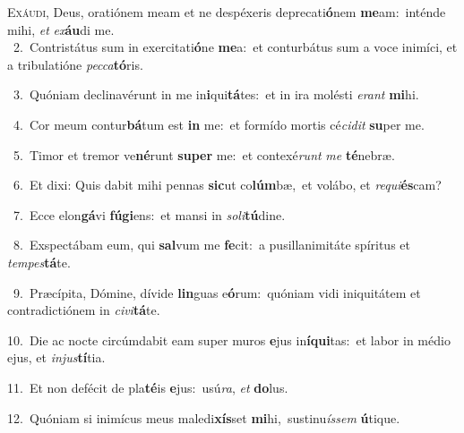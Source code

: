 \lettrine{\initial\textcolor{\initialcolor}{E}}{xáudi,} Deus, oratiónem meam et ne despéxeris deprecati\-\textbf{ó}\-nem \textbf{me}\-am:~\star inténde mihi, \textit{et} \textit{ex}\-\textbf{áu}di me.\\
{\numbfont\textcolor{\numbcolor}{~2.}}~Contristátus sum in exercitati\-\textbf{ó}\-ne \textbf{me}\-a:~\star et conturbátus sum a voce inimíci, et a tribulatióne \textit{pec}\-\textit{ca}\textbf{tó}ris.\par
{\numbfont\textcolor{\numbcolor}{~3.}}~Quóniam declinavérunt in me in\-\textbf{i}\-qui\-\textbf{tá}\-tes:~\star et in ira molésti \textit{e}\-\textit{rant} \textbf{mi}\-hi.\par
{\numbfont\textcolor{\numbcolor}{~4.}}~Cor meum contur\-\textbf{bá}\-tum est \textbf{in} me:~\star et formído mortis cé\-\textit{ci}\-\textit{dit} \textbf{su}\-per me.\par
{\numbfont\textcolor{\numbcolor}{~5.}}~Timor et tremor ve\-\textbf{né}\-runt \textbf{su}\-\textbf{per} me:~\star et contexé\textit{runt} \textit{me} \textbf{té}\-nebræ.\par
{\numbfont\textcolor{\numbcolor}{~6.}}~Et dixi: Quis dabit mihi pennas \textbf{sic}\-ut co\-\textbf{lúm}\-bæ,~\star et volábo, et \textit{re}\-\textit{qui}\textbf{és}cam?\par
{\numbfont\textcolor{\numbcolor}{~7.}}~Ecce elon\-\textbf{gá}\-vi \textbf{fú}\-\textbf{gi}ens:~\star et mansi in \textit{so}\-\textit{li}\textbf{tú}dine.\par
{\numbfont\textcolor{\numbcolor}{~8.}}~Exspectábam eum, qui \textbf{sal}\-vum me \textbf{fe}\-cit:~\star a pusillanimitáte spíritus et \textit{tem}\-\textit{pes}\textbf{tá}te.\par
{\numbfont\textcolor{\numbcolor}{~9.}}~Præcípita, Dómine, dívide \textbf{lin}\-guas e\-\textbf{ó}\-rum:~\star quóniam vidi iniquitátem et contradictiónem in \textit{ci}\-\textit{vi}\textbf{tá}te.\par
{\numbfont\textcolor{\numbcolor}{10.}}~Die ac nocte circúmdabit eam super muros \textbf{e}\-jus in\-\textbf{í}\-\textbf{qui}tas:~\star et labor in médio ejus, et \textit{in}\-\textit{jus}\textbf{tí}tia.\par
{\numbfont\textcolor{\numbcolor}{11.}}~Et non defécit de pla\-\textbf{té}\-is \textbf{e}\-jus:~\star usú\-\textit{ra}\-, \textit{et} \textbf{do}\-lus.\par
{\numbfont\textcolor{\numbcolor}{12.}}~Quóniam si inimícus meus maledi\-\textbf{xís}\-set \textbf{mi}\-hi,~\star sustinu\-\textit{ís}\-\textit{sem} \textbf{ú}\-tique.\par
